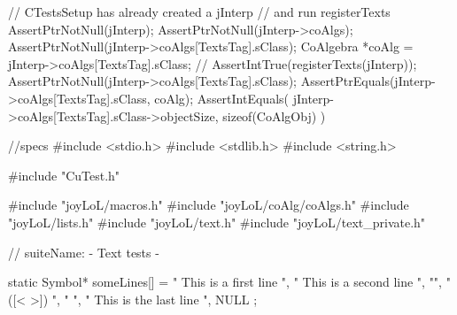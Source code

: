 \startCTest
  // CTestsSetup has already created a jInterp
  // and run registerTexts
  AssertPtrNotNull(jInterp);
  AssertPtrNotNull(jInterp->coAlgs);
  AssertPtrNotNull(jInterp->coAlgs[TextsTag].sClass);
  CoAlgebra *coAlg = jInterp->coAlgs[TextsTag].sClass;
//  AssertIntTrue(registerTexts(jInterp));
  AssertPtrNotNull(jInterp->coAlgs[TextsTag].sClass);
  AssertPtrEquals(jInterp->coAlgs[TextsTag].sClass, coAlg);
  AssertIntEquals(
    jInterp->coAlgs[TextsTag].sClass->objectSize,
    sizeof(CoAlgObj)
  )
\stopCTest
\stopTestCase
\stopTestSuite

\starttyping
//specs
#include <stdio.h>
#include <stdlib.h>
#include <string.h>

#include "CuTest.h"

#include "joyLoL/macros.h"
#include "joyLoL/coAlg/coAlgs.h"
#include "joyLoL/lists.h"
#include "joyLoL/text.h"
#include "joyLoL/text_private.h"

// suiteName: - Text tests -

static Symbol* someLines[] = {
  "  This is a first line  ",
  "  This is a second line   ",
  "",
  " ([<{ }>]) ",
  "     	",
  "  This is the last line  ",
  NULL
};

